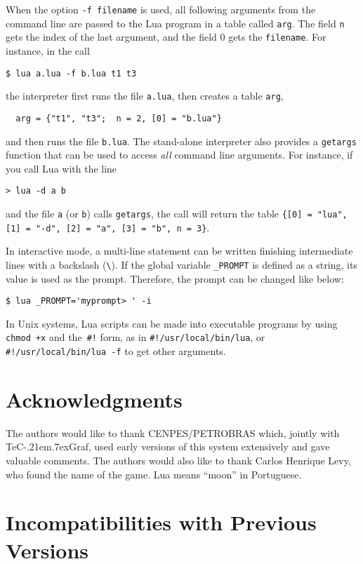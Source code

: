 \documentclass[11pt]{article}
\newcommand{\T}[1]{{\tt #1}}
\def\tecgraf{{\sf TeC\kern-.21em\lower.7ex\hbox{Graf}}}
\newcommand{\Deffunc}[1]{\index{#1}}
\begin{document}
When the option \T{-f filename} is used,
all following arguments from the command line
are passed to the Lua program in a table called \verb|arg|.
The field \verb|n| gets the index of the last argument,
and the field 0 gets the \T{filename}.
For instance, in the call
\begin{verbatim}
$ lua a.lua -f b.lua t1 t3
\end{verbatim}
the interpreter first runs the file \T{a.lua},
then creates a table \T{arg},
\begin{verbatim}
  arg = {"t1", "t3";  n = 2, [0] = "b.lua"}
\end{verbatim}
and then runs the file \T{b.lua}.
The stand-alone interpreter also provides a \verb|getargs| function that
can be used to access \emph{all} command line arguments.
For instance, if you call Lua with the line 
\begin{verbatim}
> lua -d a b 
\end{verbatim}
and the file \verb|a| (or \verb|b|) calls \verb|getargs|,
the call will return the table
\verb|{[0] = "lua", [1] = "-d", [2] = "a", [3] = "b", n = 3}|.
\Deffunc{getargs}

In interactive mode,
a multi-line statement can be written finishing intermediate
lines with a backslash (\verb|\|).
If the global variable \verb|_PROMPT| is defined as a string,
its value is used as the prompt. 
Therefore, the prompt can be changed like below:
\begin{verbatim}
$ lua _PROMPT='myprompt> ' -i
\end{verbatim}

In Unix systems, Lua scripts can be made into executable programs
by using \verb|chmod +x| and the~\verb|#!| form,
as in \verb|#!/usr/local/bin/lua|,
or \verb|#!/usr/local/bin/lua -f| to get other arguments.


\section*{Acknowledgments}

The authors would like to thank CENPES/PETROBRAS which,
jointly with \tecgraf, used early versions of
this system extensively and gave valuable comments.
The authors would also like to thank Carlos Henrique Levy,
who found the name of the game.
Lua means ``moon'' in Portuguese.


\appendix

\section*{Incompatibilities with Previous Versions}
\end{document}
